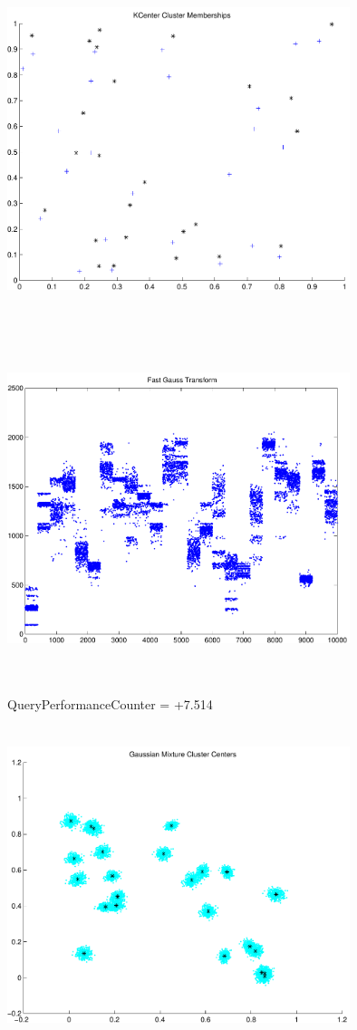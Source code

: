 \documentclass[9pt]{article}
\theoremstyle{plain}
\theoremstyle{definition}
\theoremstyle{remark}
\numberwithin{equation}{section}
\begin{document}
\includegraphics[width=10.0cm,height=10.0cm]{KCenterClusterMemberships_25_Centers.pdf}

\includegraphics[width=10.0cm,height=10.0cm]{FGT25_Centers.pdf}

QueryPerformanceCounter  =  +7.514
\includegraphics[width=10.0cm,height=10.0cm]{GaussianMixture_ClusterCenters24_Centers.pdf}
\end{document}
